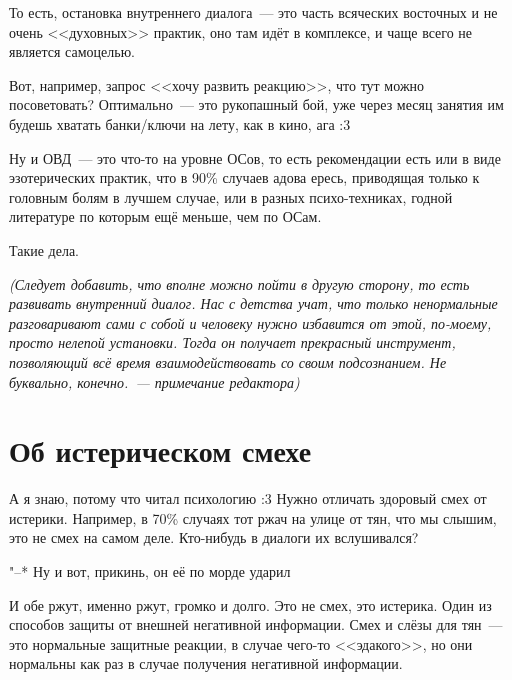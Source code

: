 \documentclass[a5paper,12pt,twoside]{memoir}
\begin{document}
То есть, остановка внутреннего диалога~--- это часть всяческих восточных и не очень <<духовных>> практик, оно там идёт в комплексе, и чаще всего не является самоцелью.

Вот, например, запрос <<хочу развить реакцию>>, что тут можно посоветовать? Оптимально~--- это рукопашный бой, уже через месяц занятия им будешь хватать банки/ключи на лету, как в кино, ага :3 

Ну и ОВД~--- это что-то на уровне ОСов, то есть рекомендации есть или в виде эзотерических практик, что в 90\% случаев адова ересь, приводящая только к головным болям в лучшем случае, или в разных психо-техниках, годной литературе по которым ещё меньше, чем по ОСам. 

Такие дела.

\smallskip

\textit{(Следует добавить, что вполне можно пойти в другую сторону, то есть развивать внутренний диалог. Нас с детства учат, что только ненормальные разговаривают сами с собой и человеку нужно избавится от этой, по-моему, просто нелепой установки. Тогда он получает прекрасный инструмент, позволяющий всё время взаимодействовать со своим подсознанием. Не буквально, конечно.~--- примечание редактора)}




\section{Об истерическом смехе}

\medskip
А я знаю, потому что читал психологию :3 Нужно отличать здоровый смех от истерики. Например, в 70\% случаях тот ржач на улице от тян, что мы слышим, это не смех на самом деле. Кто-нибудь в диалоги их вслушивался? 

"--* Ну и вот, прикинь, он её по морде ударил

И обе ржут, именно ржут, громко и долго. Это не смех, это истерика. Один из способов защиты от внешней негативной информации. Смех и слёзы для тян~--- это нормальные защитные реакции, в случае чего-то <<эдакого>>, но они нормальны как раз в случае получения негативной информации.
\end{document}
